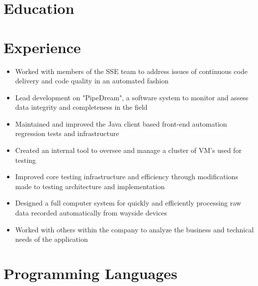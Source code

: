 \documentclass[11pt,letterpaper,sans]{moderncv}        %
\begin{document}
\makecvtitle

\section{Education}

\section{Experience}

\begin{itemize}
\item Worked with members of the SSE team to address issues of continuous code delivery and code quality in an automated fashion
\item Lead development on "PipeDream", a software system to monitor and assess data integrity and completeness in the field
\item Maintained and improved the Java client based front-end automation regression tests and infrastructure
\end{itemize}

\begin{itemize}
\item Created an internal tool to oversee and manage a cluster of VM's used for testing
\item Improved core testing infrastructure and efficiency through modifications made to 
testing architecture and implementation
\end{itemize}

\begin{itemize}
\item Designed a full computer system for quickly and efficiently processing raw data recorded automatically from wayside devices
\item Worked with others within the company to analyze the business and technical needs of the application
\end{itemize}

\section{Programming Languages}
\end{document}

